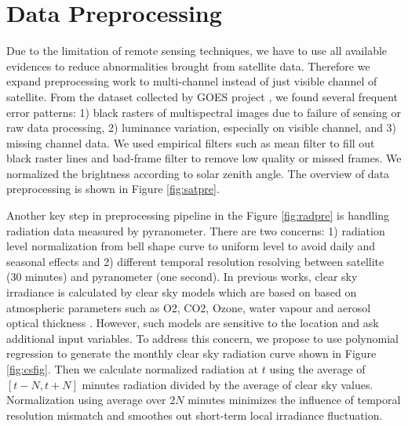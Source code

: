 \documentclass[conference]{IEEEtran}
\begin{document}
\section{Data Preprocessing} %
\label{sec:preprocessing}

Due to the limitation of remote sensing techniques,
we have to use all available evidences to reduce abnormalities brought from
satellite data. Therefore we expand preprocessing work to multi-channel instead
of just visible channel of satellite. From the dataset collected by GOES project
\cite{GOES:2013:Online}, we found several frequent error patterns: 1) black rasters of multispectral images due to failure
of sensing or raw data processing, 2) luminance variation, especially on visible
channel, and 3) missing channel data. We used empirical filters such as mean
filter to fill out black raster lines and bad-frame filter to remove low quality
or missed frames. We normalized the brightness according to solar zenith angle. 
The overview of data preprocessing is shown in Figure \ref{fig:satpre}. 

Another key step in preprocessing pipeline in the Figure \ref{fig:radpre} is
handling radiation data measured by pyranometer. There are two concerns: 1) radiation level
normalization from bell shape curve to uniform level to avoid daily and seasonal
effects and 2) different temporal resolution resolving between satellite (30 minutes) and pyranometer 
(one second). In previous works, clear sky irradiance is calculated by clear sky
models which are based on based on atmospheric parameters such as O2, CO2,
Ozone, water vapour and aerosol optical thickness
\cite{perez2002new}. However, such models are sensitive to
the location and ask additional input variables. To address this concern, 
we propose to use polynomial regression to generate the monthly clear sky
radiation curve shown in Figure \ref{fig:csfig}. Then we calculate
normalized radiation at $t$ using the average of $[t-N,t+N]$ minutes
radiation divided by the average of clear sky values. 
Normalization using average over $2N$ minutes minimizes
the influence of temporal resolution mismatch and smoothes out short-term local
irradiance fluctuation. 
\end{document}
